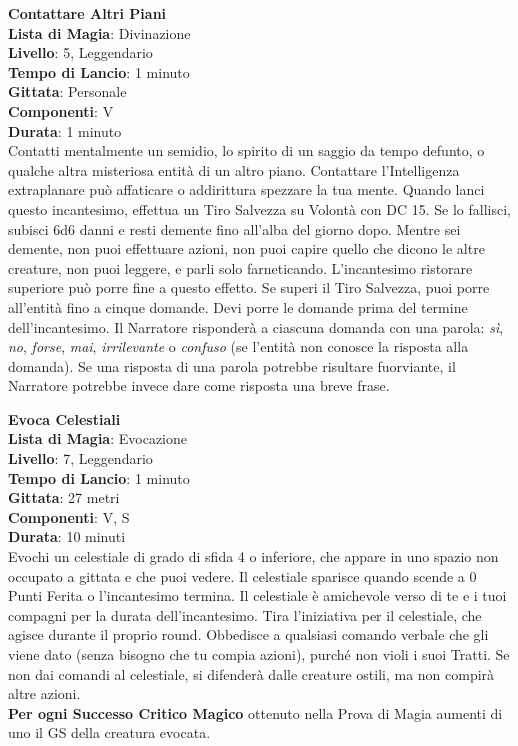 \documentclass[a4paper,twoside,openany]{book}
\begin{document}
\begin{multicols}{2}
\medskip\textbf{Contattare Altri Piani}\\
\textbf{Lista di Magia}: Divinazione\\
\textbf{Livello}: 5, Leggendario\\
\textbf{Tempo di Lancio}: 1 minuto\\
\textbf{Gittata}: Personale\\
\textbf{Componenti}: V\\
\textbf{Durata}: 1 minuto\\
Contatti mentalmente un semidio, lo spirito di un saggio da tempo defunto, o qualche altra misteriosa entità di un altro piano. Contattare l'Intelligenza extraplanare può affaticare o addirittura spezzare la tua mente. Quando lanci questo incantesimo, effettua un Tiro Salvezza su Volontà con DC 15. Se lo fallisci, subisci 6d6 danni e resti demente fino all'alba del giorno dopo. Mentre sei demente, non puoi effettuare azioni, non puoi capire quello che dicono le altre creature, non puoi leggere, e parli solo farneticando. L'incantesimo ristorare superiore può porre fine a questo effetto. Se superi il Tiro Salvezza, puoi porre all'entità fino a cinque domande. Devi porre le domande prima del termine dell'incantesimo. Il Narratore risponderà a ciascuna domanda con una parola: \emph{sì}, \emph{no}, \emph{forse}, \emph{mai}, \emph{irrilevante} o \emph{confuso} (se l'entità non conosce la risposta alla domanda). Se una risposta di una parola potrebbe risultare fuorviante, il Narratore potrebbe invece dare come risposta una breve frase.

\medskip\textbf{Evoca Celestiali}\\
\textbf{Lista di Magia}: Evocazione\\
\textbf{Livello}: 7, Leggendario\\
\textbf{Tempo di Lancio}: 1 minuto\\
\textbf{Gittata}: 27 metri\\
\textbf{Componenti}: V, S\\
\textbf{Durata}: 10 minuti\\
Evochi un celestiale di grado di sfida 4 o inferiore, che appare in uno spazio non occupato a gittata e che puoi vedere. Il celestiale sparisce quando scende a 0 Punti Ferita o l'incantesimo termina. Il celestiale è amichevole verso di te e i tuoi compagni per la durata dell'incantesimo. Tira l'iniziativa per il celestiale, che agisce durante il proprio round. Obbedisce a qualsiasi comando verbale che gli viene dato (senza bisogno che tu compia azioni), purché non violi i suoi Tratti. Se non dai comandi al celestiale, si difenderà dalle creature ostili, ma non compirà altre azioni.\\
\textbf{Per ogni Successo Critico Magico} ottenuto nella Prova di Magia aumenti di uno il GS della creatura evocata.


\end{multicols}
\end{document}
